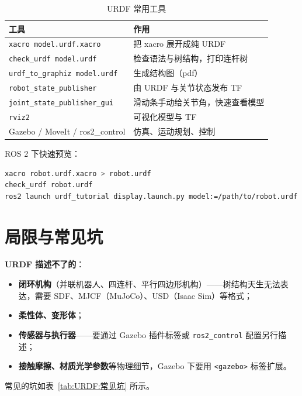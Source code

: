 \begin{table}[H]
	\centering
	\caption{URDF 常用工具}
	\label{tab:URDF:工具}
	\begin{tabular}{lp{8cm}}
		\hline
		工具 & 作用 \\
		\hline
		\texttt{xacro model.urdf.xacro} & 把 xacro 展开成纯 URDF \\
		\texttt{check\_urdf model.urdf} & 检查语法与树结构，打印连杆树 \\
		\texttt{urdf\_to\_graphiz model.urdf} & 生成结构图（pdf） \\
		\texttt{robot\_state\_publisher} & 由 URDF 与关节状态发布 TF \\
		\texttt{joint\_state\_publisher\_gui} & 滑动条手动给关节角，快速查看模型 \\
		\texttt{rviz2} & 可视化模型与 TF \\
		Gazebo / MoveIt / ros2\_control & 仿真、运动规划、控制 \\
		\hline
	\end{tabular}
\end{table}

ROS 2 下快速预览：

\begin{lstlisting}[style=code, language=bash]
xacro robot.urdf.xacro > robot.urdf
check_urdf robot.urdf
ros2 launch urdf_tutorial display.launch.py model:=/path/to/robot.urdf
\end{lstlisting}

\section{局限与常见坑}

\textbf{URDF 描述不了的}：
\begin{itemize}
	\item \textbf{闭环机构}（并联机器人、四连杆、平行四边形机构）——树结构天生无法表达，需要 SDF、MJCF（MuJoCo）、USD（Isaac Sim）等格式；
	\item \textbf{柔性体、变形体}；
	\item \textbf{传感器与执行器}——要通过 Gazebo 插件标签或 \texttt{ros2\_control} 配置另行描述；
	\item \textbf{接触摩擦、材质光学参数}等物理细节，Gazebo 下要用 \texttt{<gazebo>} 标签扩展。
\end{itemize}

常见的坑如表~\ref{tab:URDF:常见坑} 所示。


